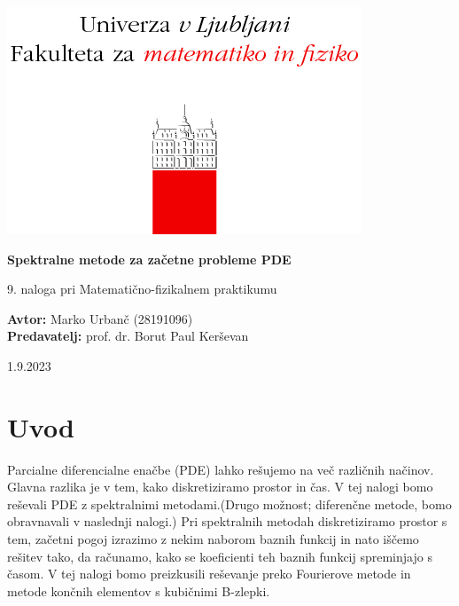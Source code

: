 \documentclass[a4paper]{article}
\begin{document}
\begin{titlepage}
    \begin{center}
        \includegraphics[]{logo.png}
        \vspace*{3cm}
        
        \Huge
        \textbf{Spektralne metode za začetne probleme PDE}
        
        \vspace{0.5cm}
        \large
        9. naloga pri Matematično-fizikalnem praktikumu

        \vspace{4.5cm}
        
        \textbf{Avtor:} Marko Urbanč (28191096)\ \\
        \textbf{Predavatelj:} prof. dr. Borut Paul Kerševan\ \\
        
        \vspace{2.8cm}
        
        \large
        1.9.2023
    \end{center}
\end{titlepage}
\tableofcontents
\newpage
\section{Uvod}
Parcialne diferencialne enačbe (PDE) lahko rešujemo na več različnih načinov.
Glavna razlika je v tem, kako diskretiziramo prostor in čas. V tej nalogi bomo 
reševali PDE z spektralnimi metodami.(Drugo možnost; diferenčne metode, bomo 
obravnavali v naslednji nalogi.) Pri spektralnih metodah diskretiziramo prostor s
tem, začetni pogoj izrazimo z nekim naborom baznih funkcij in nato iščemo rešitev
tako, da računamo, kako se koeficienti teh baznih funkcij spreminjajo s časom.
V tej nalogi bomo preizkusili reševanje preko Fourierove metode in metode končnih
elementov s kubičnimi B-zlepki.\\
\end{document}
